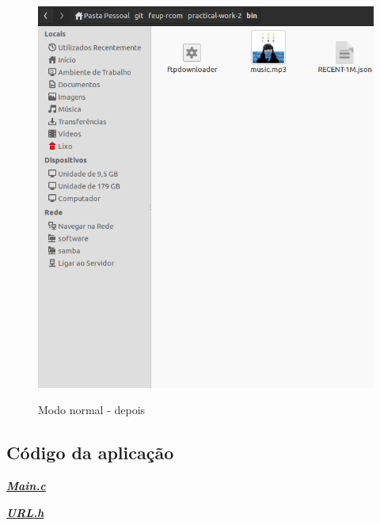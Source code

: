 \documentclass[a4paper]{article}
\begin{document}
\begin{figure}[h!]
\centering
\caption{Modo normal - depois}
\includegraphics[scale=0.35]{res/depois-modonormal.png}
\label{fig:depoisnormal}
\end{figure}

\subsection{Código da aplicação}
\newenvironment{changemargin}[2]{%
\begin{list}{}{%
\setlength{\topsep}{0pt}%
\setlength{\leftmargin}{#1}%
\setlength{\rightmargin}{#2}%
\setlength{\listparindent}{\parindent}%
\setlength{\itemindent}{\parindent}%
\setlength{\parsep}{\parskip}%
}%
\item[]}{
\end{list}}

{\underline{\textit{\textbf{Main.c}}}}

\begin{changemargin}{-3cm}{-4cm}
{\small}
\end{changemargin}

{\underline{\textit{\textbf{URL.h}}}}
\end{document}
